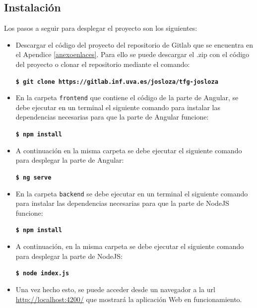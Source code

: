 \subsection{Instalación}
Los pasos a seguir para desplegar el proyecto son los siguientes:
\begin{itemize}
    \item Descargar el código del proyecto del repositorio de Gitlab que se encuentra en el Apendice \ref{anexoenlaces}. Para ello se puede descargar el .zip con el código del proyecto o clonar el repositorio mediante el comando:
    
         \textbf{\texttt{\$  git clone https://gitlab.inf.uva.es/josloza/tfg-josloza}   }                   
      
       
   
    \item En la carpeta \texttt{frontend} que contiene el código de la parte de Angular, se debe ejecutar en un terminal el siguiente comando para instalar las dependencias necesarias para que la parte de Angular funcione:
    
      \textbf{\texttt{\$  npm install}   } 
      
        
    
    \item A continuación en la misma carpeta se debe ejecutar el siguiente comando para desplegar la parte de Angular:
   
       \textbf{\texttt{\$  ng serve}   }  
      
        

        \item En la carpeta \texttt{backend} se debe ejecutar en un terminal el siguiente comando para instalar las dependencias necesarias para que la parte de NodeJS funcione:
      
          \textbf{\texttt{\$  npm install}   }  

        \item A continuación, en la misma carpeta se debe ejecutar el siguiente comando para desplegar la parte de NodeJS:
        
            \textbf{\texttt{\$  node index.js}   }  

        \item Una vez hecho esto, se puede acceder desde un navegador a la url \url{http://localhost:4200/} que mostrará la aplicación Web en funcionamiento.
        
\end{itemize}




